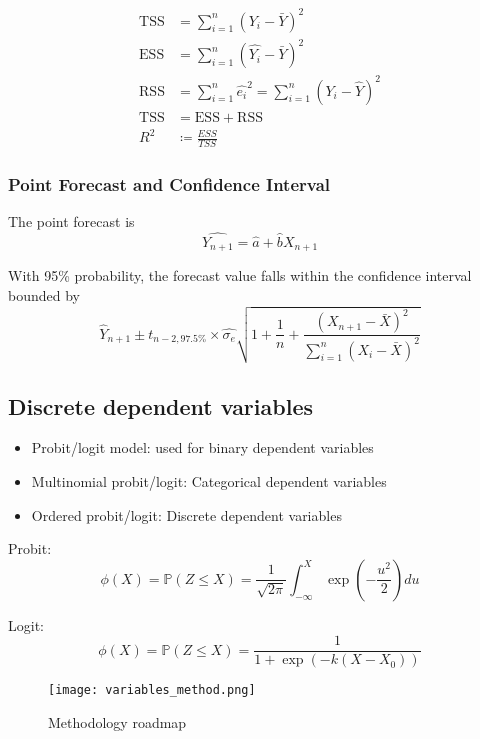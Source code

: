 \[
    \begin{aligned}
        \mathrm{TSS} &= \sum_{i=1}^n(Y_i-\bar{Y})^2\\
        \mathrm{ESS} &= \sum_{i=1}^n(\hat{Y_i}-\bar{Y})^2\\
        \mathrm{RSS} &= \sum_{i=1}^n\hat{e_i}^2 = \sum_{i=1}^n(Y_i-\hat{Y})^2\\
        \mathrm{TSS} &= \mathrm{ESS} + \mathrm{RSS}\\
        R^2 &\coloneqq \frac{ESS}{TSS}
    \end{aligned}
\]

\subsubsection{Point Forecast and Confidence Interval}
The point forecast is 
\[
    \hat{Y_{n+1}} = \hat{a} + \hat{b}X_{n+1}
\]

With 95\% probability, the forecast value falls within the confidence interval bounded by
\[
    \hat{Y}_{n+1} \pm t_{n-2,97.5\%} \times \hat{\sigma_e}\sqrt{1+\frac{1}{n}+\frac{(X_{n+1}-\bar{X})^2}{\sum_{i=1}^n(X_i-\bar{X})^2}}
\]

\subsection{Discrete dependent variables}
\begin{itemize}
    \item Probit/logit model: used for binary dependent variables
    \item Multinomial probit/logit: Categorical dependent variables
    \item Ordered probit/logit: Discrete dependent variables
\end{itemize}

Probit:
\[
    \phi(X) = \mathbb{P}(Z\leq X) = \frac{1}{\sqrt{2\pi}}\int_{-\infty}^X \exp(-\frac{u^2}{2})du
\]

Logit:
\[
    \phi(X) = \mathbb{P}(Z\leq X) = \frac{1}{1+\exp(-k(X-X_0))}
\]

\begin{figure}[!ht]
	\centering
	\texttt{[image: variables\_method.png]}
	\caption{Methodology roadmap}
\end{figure}
